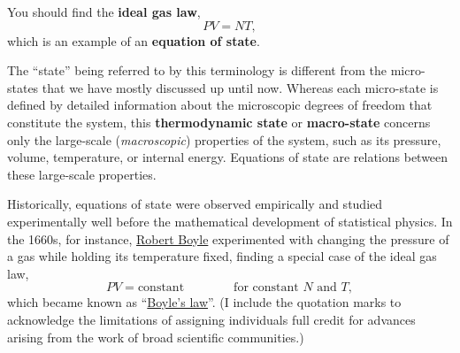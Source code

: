 \begin{shaded}
  You should find the \textbf{ideal gas law},
  \begin{equation}
    \label{eq:ideal_gas_law}
    PV = NT,
  \end{equation}
  which is an example of an \textbf{equation of state}.
\end{shaded}

The ``state'' being referred to by this terminology is different from the micro-states that we have mostly discussed up until now.
Whereas each micro-state is defined by detailed information about the microscopic degrees of freedom that constitute the system, this \textbf{thermodynamic state} or \textbf{macro-state} concerns only the large-scale (\textit{macroscopic}) properties of the system, such as its pressure, volume, temperature, or internal energy.
Equations of state are relations between these large-scale properties.

Historically, equations of state were observed empirically and studied experimentally well before the mathematical development of statistical physics.
In the 1660s, for instance, \href{https://en.wikipedia.org/wiki/Robert_Boyle}{Robert Boyle} experimented with changing the pressure of a gas while holding its temperature fixed, finding a special case of the ideal gas law,
\begin{equation*}
  PV = \mbox{constant} \qquad\qquad \mbox{for constant } N \mbox{ and } T,
\end{equation*}
which became known as ``\href{https://en.wikipedia.org/wiki/Boyle's_law}{Boyle's law}''.
(I include the quotation marks to acknowledge the limitations of assigning individuals full credit for advances arising from the work of broad scientific communities.)

